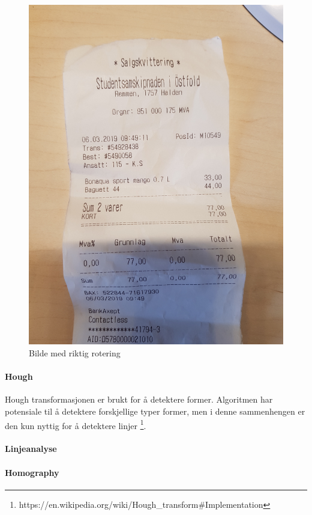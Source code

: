 \documentclass{article}
\begin{document}
\begin{figure}[h]
\centering
\includegraphics[scale=0.05, angle=270]{images/skewed10}
\caption{Bilde med riktig rotering}
\label{fig:skewed10}
\end{figure}

\paragraph{Hough}
Hough transformasjonen er brukt for å detektere former. Algoritmen har potensiale til å detektere forskjellige typer former, men i denne sammenhengen er den kun nyttig for å detektere linjer \footnote{https://en.wikipedia.org/wiki/Hough_transform#Implementation}. 
\paragraph{Linjeanalyse}
\paragraph{Homography}
\end{document}
